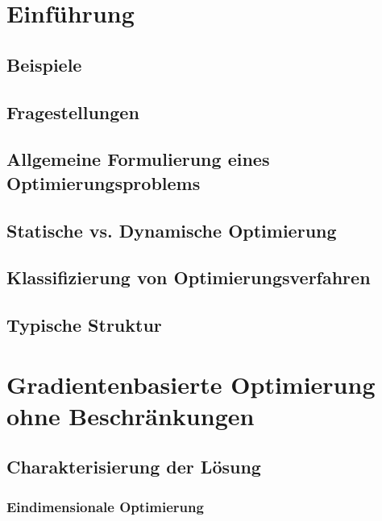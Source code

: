 \chapter{Einführung} %

    \section{Beispiele} %

    \section{Fragestellungen} %

    \section{Allgemeine Formulierung eines Optimierungsproblems} %

    \section{Statische vs. Dynamische Optimierung} %

    \section{Klassifizierung von Optimierungsverfahren} %

    \section{Typische Struktur} %

\chapter{Gradientenbasierte Optimierung ohne Beschränkungen} %

    \section{Charakterisierung der Lösung} %

        \subsection{Eindimensionale Optimierung} %

